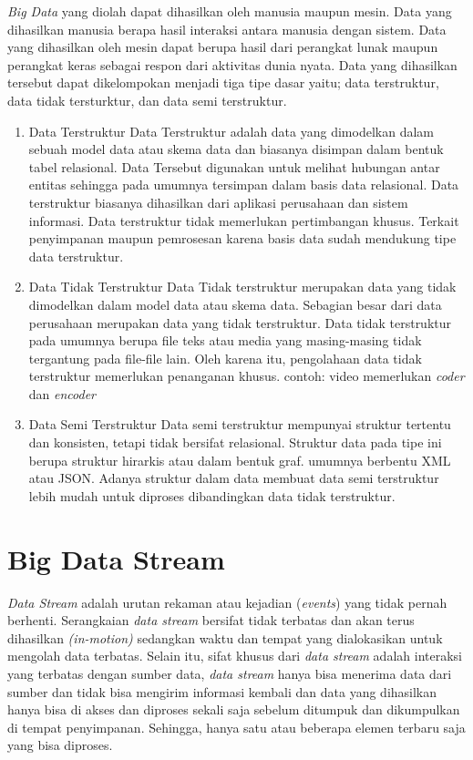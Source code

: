 \textit{Big Data} yang diolah dapat dihasilkan oleh manusia maupun mesin. Data yang dihasilkan manusia berapa hasil interaksi antara manusia dengan sistem. Data yang dihasilkan oleh mesin dapat berupa hasil dari perangkat lunak maupun perangkat keras sebagai respon dari aktivitas dunia nyata. Data yang dihasilkan tersebut dapat dikelompokan menjadi tiga tipe dasar yaitu; data terstruktur, data tidak tersturktur, dan data semi terstruktur.

\begin{enumerate}
	\item{Data Terstruktur \newline
	Data Terstruktur adalah data yang dimodelkan dalam sebuah model data atau skema data dan 		biasanya disimpan dalam bentuk tabel relasional. Data Tersebut digunakan untuk melihat 			hubungan antar entitas sehingga pada umumnya tersimpan dalam basis data relasional. Data 		terstruktur biasanya dihasilkan dari aplikasi perusahaan dan sistem informasi. Data 			terstruktur tidak memerlukan pertimbangan khusus. Terkait penyimpanan maupun pemrosesan 		karena basis data sudah mendukung tipe data terstruktur.
	}
	
	\item{Data Tidak Terstruktur \newline
	Data Tidak terstruktur merupakan data yang tidak dimodelkan dalam model data atau skema 		data. Sebagian besar dari data perusahaan merupakan data yang tidak terstruktur. Data tidak 	terstruktur pada umumnya berupa file teks atau media yang masing-masing tidak tergantung 		pada file-file lain. Oleh karena itu, pengolahaan data tidak terstruktur memerlukan 			penanganan khusus. contoh: video memerlukan \textit{coder} dan \textit{encoder}
	}
	
	\item{Data Semi Terstruktur \newline
	Data semi terstruktur mempunyai struktur tertentu dan konsisten, tetapi tidak bersifat 			relasional. Struktur data pada tipe ini berupa struktur hirarkis atau dalam bentuk graf. 		umumnya berbentu XML atau JSON. Adanya struktur dalam data membuat data semi terstruktur 		lebih mudah untuk diproses dibandingkan data tidak terstruktur.
	}
	
\end{enumerate}
\label{sec:Big Data} 
 


\section{Big Data Stream}
\textit{Data Stream} adalah urutan rekaman atau kejadian (\textit{events}) yang tidak pernah
 berhenti. Serangkaian \textit{data stream} bersifat tidak terbatas dan akan terus dihasilkan
 \textit{(in-motion)} sedangkan waktu dan tempat yang dialokasikan untuk mengolah data terbatas.
 Selain itu, sifat khusus dari \textit{data stream} adalah interaksi yang terbatas dengan sumber
 data, \textit{data stream} hanya bisa menerima data dari sumber dan tidak bisa mengirim informasi
  kembali dan data yang dihasilkan hanya bisa di akses dan diproses sekali saja sebelum ditumpuk dan
 dikumpulkan di tempat penyimpanan. Sehingga, hanya satu atau beberapa elemen terbaru saja yang bisa
 diproses.
 
